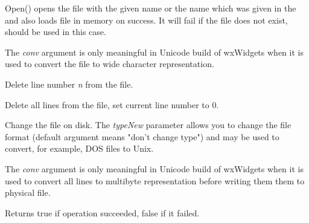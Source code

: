 Open() opens the file with the given name or the name which was given in the
 and also loads file in memory on
success. It will fail if the file does not exist, 
 should be used in this case.

The {\it conv} argument is only meaningful in Unicode build of wxWidgets when
it is used to convert the file to wide character representation.

\label{wxtextfileremoveline}


Delete line number {\it n} from the file.

\label{wxtextfileclear}


Delete all lines from the file, set current line number to 0.

\label{wxtextfilewrite}


Change the file on disk. The {\it typeNew} parameter allows you to change the
file format (default argument means "don't change type") and may be used to
convert, for example, DOS files to Unix.

The {\it conv} argument is only meaningful in Unicode build of wxWidgets when
it is used to convert all lines to multibyte representation before writing them
them to physical file.

Returns true if operation succeeded, false if it failed.

